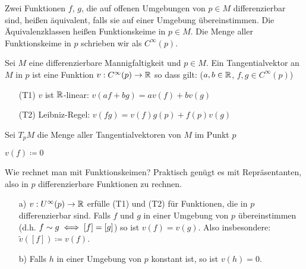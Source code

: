 \documentclass[a4paper,twoside,DIV15,BCOR12mm]{scrbook}
\renewcommand{\da}{\coloneqq}
\begin{document}
\begin{definition}[Funktionskeim]
Zwei Funktionen $f$, $g$, die auf offenen Umgebungen von $p\in M$ differenzierbar sind, heißen äquivalent, falls sie auf einer Umgebung übereinstimmen. Die Äquivalenzklassen heißen Funktionskeime in $p\in M$. Die Menge aller Funktionskeime in $p$ schrieben wir als $C^\infty(p)$.
\end{definition}

\begin{definition}[Tangentialvektor]
Sei $M$ eine differenzierbare Mannigfaltigkeit und $p\in M$. Ein Tangentialvektor an $M$ in $p$ ist eine Funktion $v:C^\infty(p) \to \mathbb{R}$ so dass gilt: ($a,b\in\mathbb{R}$, $f,g\in C^\infty(p)$)
\begin{itemize}
\item[(T1)] $v$ ist $\mathbb{R}$-linear: $v(af + bg) = a v(f) + b v(g)$
\item[(T2)] Leibniz-Regel: $v(fg) = v(f)g(p) + f(p)v(g)$ 
\end{itemize}
Sei $T_pM$ die Menge aller Tangentialvektoren von $M$ im Punkt $p$
\end{definition}

\begin{beispiel}
$v(f) \da 0$
\end{beispiel}

Wie rechnet man mit Funktionskeimen? Praktisch genügt es mit Repräsentanten, also in $p$ differenzierbare Funktionen zu rechnen.

\begin{lemma}
\begin{itemize}
\item[a)]
$v:U^\infty(p) \to \mathbb{R}$ erfülle (T1) und (T2) für Funktionen, die in $p$ differenzierbar sind. Falls $f$ und $g$ in einer Umgebung von $p$ übereinstimmen (d.h. $f\sim g \iff [f] = [g]$) so ist $v(f) = v(g)$. Also insbesondere: $\tilde v([f]) \da v(f)$.
\item[b)]
Falls $h$ in einer Umgebung von $p$ konstant ist, so ist $v(h)=0$.
\end{itemize}
\end{lemma}
\end{document}
